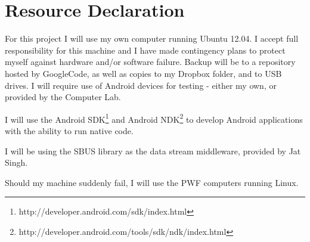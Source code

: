 \section*{Resource Declaration}

For this project I will use my own computer running Ubuntu 12.04. I accept full responsibility for this machine and I have made contingency plans to protect myself against hardware and/or software failure. Backup will be to a repository hosted by GoogleCode, as well as copies to my Dropbox folder, and to USB drives. I will require use of Android devices for testing - either my own, or provided by the Computer Lab.

I will use the Android SDK\footnote{http://developer.android.com/sdk/index.html} and Android NDK\footnote{http://developer.android.com/tools/sdk/ndk/index.html} to develop Android applications with the ability to run native code.

I will be using the SBUS library as the data stream middleware, provided by Jat Singh.

Should my machine suddenly fail, I will use the PWF computers running Linux. 
